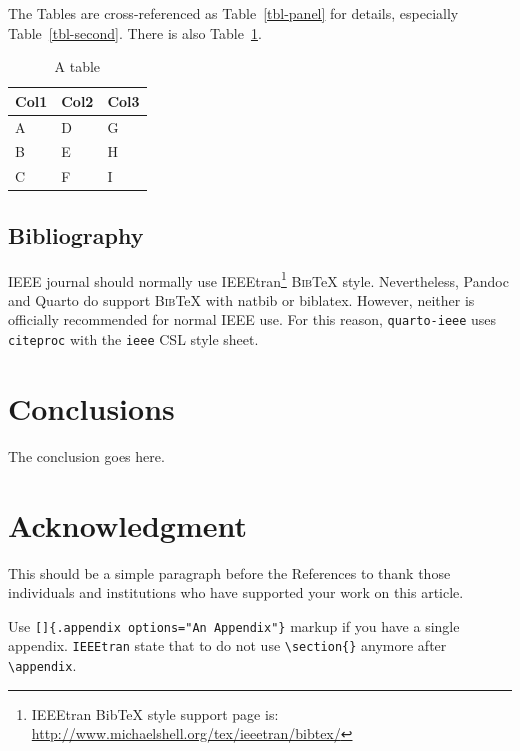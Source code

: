 \documentclass[
  journal,
]{IEEEtran}%
\theoremstyle{plain}
\theoremstyle{remark}
\begin{document}
The Tables are cross-referenced as Table~\ref{tbl-panel} for details,
especially Table~\ref{tbl-second}. There is also Table~\ref{tbl-other}.

\hypertarget{tbl-other}{}
\begin{table}
\caption{\label{tbl-other}A table }\tabularnewline

\centering
\begin{tabular}{lll}
\toprule
Col1 & Col2 & Col3\\
\midrule
A & D & G\\
B & E & H\\
C & F & I\\
\bottomrule
\end{tabular}
\end{table}

\hypertarget{bibliography}{%
\subsection{Bibliography}\label{bibliography}}

IEEE journal should normally use IEEEtran\footnote{IEEEtran BibTeX style
  support page is:
  \url{http://www.michaelshell.org/tex/ieeetran/bibtex/}}
\textsc{Bib}{\TeX} style. Nevertheless, Pandoc and Quarto do support
\textsc{Bib}{\TeX} with natbib or biblatex. However, neither is
officially recommended for normal IEEE use. For this reason,
\texttt{quarto-ieee} uses \texttt{citeproc} with the \texttt{ieee} CSL
style sheet.

\hypertarget{conclusions}{%
\section{Conclusions}\label{conclusions}}

The conclusion goes here.

\hypertarget{acknowledgment}{%
\section*{Acknowledgment}\label{acknowledgment}}

This should be a simple paragraph before the References to thank those
individuals and institutions who have supported your work on this
article.

\appendix[An Appendix]{}

Use \texttt{{[}{]}\{.appendix\ options="An\ Appendix"\}} markup if you
have a single appendix. \texttt{IEEEtran} state that to do not use
\texttt{\textbackslash{}section\{\}} anymore after
\texttt{\textbackslash{}appendix}.
\end{document}
